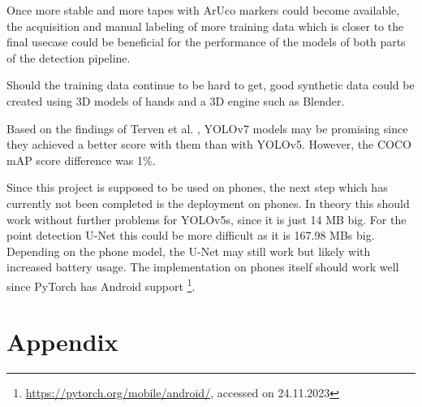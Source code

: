 \documentclass[10pt]{book}
\begin{document}

Once more stable and more tapes with \ac{ArUco} markers could become available, the acquisition and manual labeling of more training data which is closer to the final usecase could be beneficial for the performance of the models of both parts of the detection pipeline.


Should the training data continue to be hard to get, good synthetic data could be created using 3D models of hands and a 3D engine such as Blender.


Based on the findings of Terven et al. \cite{terven2023comprehensive}, \ac{YOLO}v7 models may be promising since they achieved a better score with them than with \ac{YOLO}v5. However, the \ac{COCO} \ac{mAP} score difference was 1\%.


Since this project is supposed to be used on phones, the next step which has currently not been completed is the deployment on phones. In theory this should work without further problems for \ac{YOLO}v5s, since it is just 14 \ac{MB} big. For the point detection U-Net this could be more difficult as it is 167.98 \acp{MB} big. Depending on the phone model, the U-Net may still work but likely with increased battery usage. The implementation on phones itself should work well since PyTorch has Android support \footnote{\url{https://pytorch.org/mobile/android/}, accessed on 24.11.2023}.


\chapter{Appendix}
\end{document}
